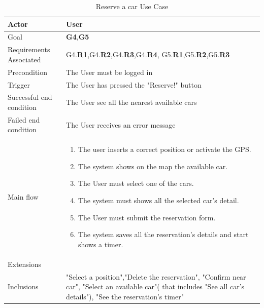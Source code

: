 \newline
\begin{table}[htb]
\begin{center}
\renewcommand{\arraystretch}{1.5}
\begin{tabular}{|l|p{}|}
\hline
Actor & User \\ \hline
Goal & \textbf{G4},\textbf{G5} \\ \hline
Requirements Associated & G4.\textbf{R1},G4.\textbf{R2},G4.\textbf{R3},G4.\textbf{R4}, G5.\textbf{R1},G5.\textbf{R2},G5.\textbf{R3} \\ \hline
Precondition & The User must be logged in \\ \hline
Trigger & The User has pressed the "Reserve!" button \\ \hline
Successful end condition & The User see all the nearest available cars \\ \hline
Failed end condition & The User receives an error message \\ \hline
Main flow & \begin{minipage}[t]{0.6\textwidth}
\begin{enumerate}
\addtolength{\itemindent}{0.5cm}
\item The user inserts a correct position or activate the GPS.
\item The system shows on the map the available car.
\item The User must select one of the cars.
\item The system must shows all the selected car's detail.
\item The User must submit the reservation form.
\item The system saves all the reservation's details and start shows a timer. 
\end{enumerate}
\end{minipage} \\ \hline
Extensions & \\ \hline
Inclusions & "Select a position","Delete the reservation", "Confirm near car", "Select an available car"( that includes "See all car's details"), "See the reservation's timer" \\ \hline
\end{tabular}
\caption{Reserve a car Use Case}
\end{center}
\end{table}
\clearpage

